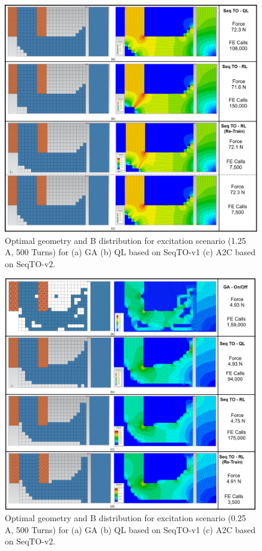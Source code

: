 \begin{figure}[h!]
    \centering
    \includegraphics[width=\textwidth]{Figures/Ch_RL/Ccore_1.25A.png}
    \caption{Optimal geometry and B distribution for excitation scenario (1.25 A, 500 Turns) for (a) GA (b) QL based on SeqTO-v1 (c) A2C based on SeqTO-v2.}
    \label{fig:RL_Ccore_1.25A}
\end{figure}

\begin{figure}[h!]
    \centering
    \includegraphics[width=\textwidth]{Figures/Ch_RL/Ccore_0.25A.png}
    \caption{Optimal geometry and B distribution for excitation scenario (0.25 A, 500 Turns) for (a) GA (b) QL based on SeqTO-v1 (c) A2C based on SeqTO-v2.}
    \label{fig:RL_Ccore_0.25A}
\end{figure}


